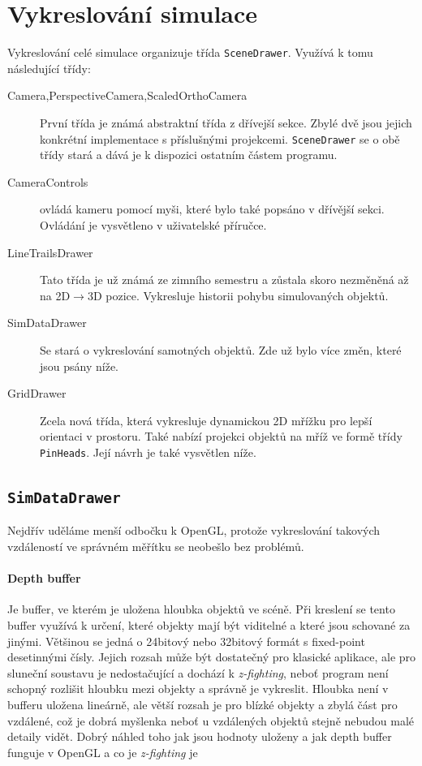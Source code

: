 \section{Vykreslování simulace}
Vykreslování celé simulace organizuje třída \texttt{SceneDrawer}. Využívá k tomu následující třídy:
\begin{description}
 	\item[Camera,PerspectiveCamera,ScaledOrthoCamera] První třída je známá abstraktní třída z dřívejší sekce. Zbylé dvě jsou jejich konkrétní implementace s příslušnými projekcemi.
 	\texttt{SceneDrawer} se o obě třídy stará a dává je k dispozici ostatním částem programu.
 	
 	\item[CameraControls] ovládá kameru pomocí myši, které bylo také popsáno v dřívější sekci. Ovládání je vysvětleno v uživatelské příručce.
 	
 	\item[LineTrailsDrawer] Tato třída je už známá ze zimního semestru a zůstala skoro nezměněná až na 2D$ \rightarrow $3D pozice. Vykresluje historii pohybu simulovaných objektů.
 	
 	\item[SimDataDrawer] Se stará o vykreslování samotných objektů. Zde už bylo více změn, které jsou psány níže.
 	
 	\item[GridDrawer] Zcela nová třída, která vykresluje dynamickou 2D mřížku pro lepší orientaci v prostoru. Také nabízí projekci objektů na mříž ve formě třídy \texttt{PinHeads}. Její návrh je také vysvětlen níže.

\end{description}

\subsection{\texttt{SimDataDrawer}}
Nejdřív uděláme menší odbočku k OpenGL, protože vykreslování takových vzdáleností ve správném měřítku se neobešlo bez problémů.
\paragraph{Depth buffer}
\label{par:depthBuffer}
Je buffer, ve kterém je uložena hloubka objektů ve scéně. Při kreslení se tento buffer využívá k určení, které objekty mají být viditelné a které jsou schované za jinými. Většinou se jedná o 24bitový nebo 32bitový formát s fixed-point desetinnými čísly. Jejich rozsah může být dostatečný pro klasické aplikace, ale pro sluneční soustavu je nedostačující a dochází k \textit{z-fighting}, neboť program není schopný rozlišit hloubku mezi objekty a správně je vykreslit.
Hloubka není v bufferu uložena lineárně, ale větší rozsah je pro blízké objekty a zbylá část pro vzdálené, což je dobrá myšlenka neboť u vzdálených objektů stejně nebudou malé detaily vidět. Dobrý náhled toho jak jsou hodnoty uloženy a jak depth buffer funguje v OpenGL a co je \textit{z-fighting} je \cite{depthBuff}


